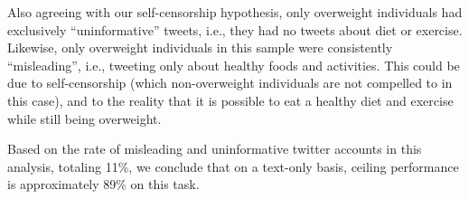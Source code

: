 Also agreeing with our self-censorship hypothesis, only overweight individuals had exclusively ``uninformative'' tweets, i.e., they had no tweets about diet or exercise. Likewise, only overweight individuals in this sample were consistently ``misleading'', i.e., tweeting only about healthy foods and activities. 
This could be due to self-censorship (which non-overweight individuals are not compelled to in this case), and to the reality that it is possible to eat a healthy diet and exercise while still being overweight.

Based on the rate of misleading and uninformative twitter accounts in this analysis, totaling 11\%, we 
conclude that on a text-only basis, ceiling performance is approximately 89\% on this task.

